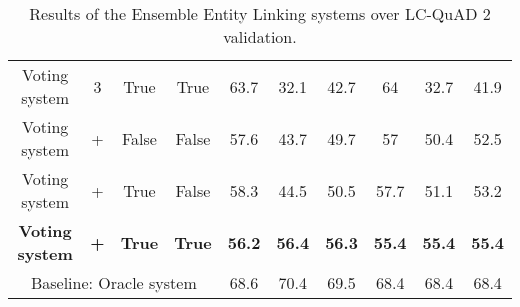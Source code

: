\begin{table}[h!]
{\begin{tabular}{|c|ccc|ccc|ccc|}
    Voting system                    & 3                                                                                                    & True                                                                                                      & True                               & 63.7                                 & 32.1                                    & 42.7              & 64                                   & 32.7                                    & 41.9              \\
    Voting system                    & +                                                                                                    & False                                                                                                     & False                              & 57.6                                 & 43.7                                    & 49.7              & 57                                   & 50.4                                    & 52.5              \\
    Voting system                    & +                                                                                                    & True                                                                                                      & False                              & 58.3                                 & 44.5                                    & 50.5              & 57.7                                 & 51.1                                    & 53.2              \\
    \textbf{Voting system}           & \textbf{+}                                                                                           & \textbf{True}                                                                                             & \textbf{True}                      & \textbf{56.2}                        & \textbf{56.4}                           & \textbf{56.3}     & \textbf{55.4}                        & \textbf{55.4}                           & \textbf{55.4}     \\ \hline
    \multicolumn{4}{|c|}{Baseline: Oracle system}                                                                                                                                                                                                                                            & 68.6                                 & 70.4                                    & 69.5              & 68.4                                 & 68.4                                    & 68.4              \\ \hline
    \end{tabular}%
    }
    \caption{Results of the Ensemble Entity Linking systems over LC-QuAD 2 validation.}
    \label{table:eelResultsLcquad2}
\end{table}

